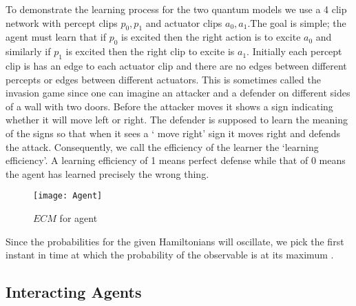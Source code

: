 \documentclass[twocolumn,prX,longbibliography]{revtex4}
\begin{document}
  To demonstrate the learning process for the two quantum models we use a 4 clip network with percept clips \(p_0, p_1 \) and actuator clips \(a_0, a_1\).The goal is simple; the agent must learn that if \(p_0\) is excited then the right action is to excite \(a_0\) and similarly if \(p_1\) is excited then the right clip to excite is \(a_1\). Initially each percept clip is has an edge to each actuator clip and there are no edges between different percepts or edges between different actuators. \newline 
  \indent This is sometimes called the invasion game since one can imagine an attacker and a defender on different sides of a wall with two doors. Before the attacker moves it shows a sign indicating whether it will move left or right. The defender is supposed to learn the meaning of the signs so that when it sees a  ` move right' sign it moves right and defends the attack. Consequently, we call the efficiency of the learner the `learning efficiency'. A learning efficiency of 1 means perfect defense while that of 0 means the agent has learned precisely the wrong thing.
\begin{center}
   \begin{figure}[H]
     \texttt{[image: Agent]} 
     \caption{\(ECM\) for agent}
   \end{figure}
\end{center}   

Since the probabilities for the given Hamiltonians will oscillate, we pick the first instant in time at which the probability of the observable is at its maximum \cite{Johansson2013}.

\subsection*{Interacting Agents}
\end{document}
